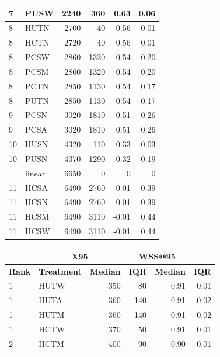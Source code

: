 \documentclass{svjour3}
\theoremstyle{break}
\begin{document}
\begin{table}
\begin{center}
{{\begin{tabular}{l@{~~~}l@{~~~}r@{~~~}r@{~~~}r@{~~~}r}
  7 &         PUSW &    2240  &  360 & 0.63 & 0.06 \\
\hline  8 &         HUTN &    2700  &  40 & 0.56 & 0.01 \\
\rowcolor{red!30}
  8 &         HCTN &    2720  &  40 & 0.56 & 0.01 \\
  8 &         PCSW &    2860  &  1320 & 0.54 & 0.20 \\
  8 &         PCSM &    2860  &  1320 & 0.54 & 0.20 \\
  8 &         PCTN &    2850  &  1130 & 0.54 & 0.17 \\
  8 &         PUTN &    2850  &  1130 & 0.54 & 0.17 \\
\hline  9 &         PCSN &    3020  &  1810 & 0.51 & 0.26 \\
  9 &         PCSA &    3020  &  1810 & 0.51 & 0.26 \\
\hline 10 &         HUSN &    4320  &  110 &  0.33 & 0.03 \\
 10 &         PUSN &    4370  &  1290 & 0.32 & 0.19 \\
 \rowcolor{blue!50}
\hline 11 &       linear &    6650  &  0 & 0 & 0 \\
 11 &         HCSA &    6490  &  2760 & -0.01 & 0.39 \\
 11 &         HCSN &    6490  &  2760 & -0.01 & 0.39 \\
 11 &         HCSM &    6490  &  3110 & -0.01 & 0.44 \\
 11 &         HCSW &    6490  &  3110 & -0.01 & 0.44 \\
\hline \end{tabular}}
}
\parbox{.49\linewidth}{
\centering
{\scriptsize \begin{tabular}{l@{~~~}l@{~~~}r@{~~~}r@{~~~}r@{~~~}r}
\arrayrulecolor{lightgray}
\multicolumn{2}{l}{\textbf{Hall}}  & \multicolumn{2}{c}{\textbf{X95}} & \multicolumn{2}{c}{\textbf{WSS@95}}\\\hline
\textbf{Rank} & \textbf{Treatment} & \textbf{Median} & \textbf{IQR} & \textbf{Median} & \textbf{IQR} \\\hline
  1 &         HUTW &    350  &  80 & 0.91 & 0.01 \\
  1 &         HUTA &    360  &  140 & 0.91 & 0.02 \\
  \rowcolor{green!40}
  1 &         HUTM &    360  &  140 & 0.91 & 0.02 \\
  1 &         HCTW &    370  &  50 & 0.91 & 0.01 \\
\hline  2 &         HCTM &    400  &  90 & 0.90 & 0.01 \\

\end{tabular}}}
\end{center}
\end{table}
\end{document}
